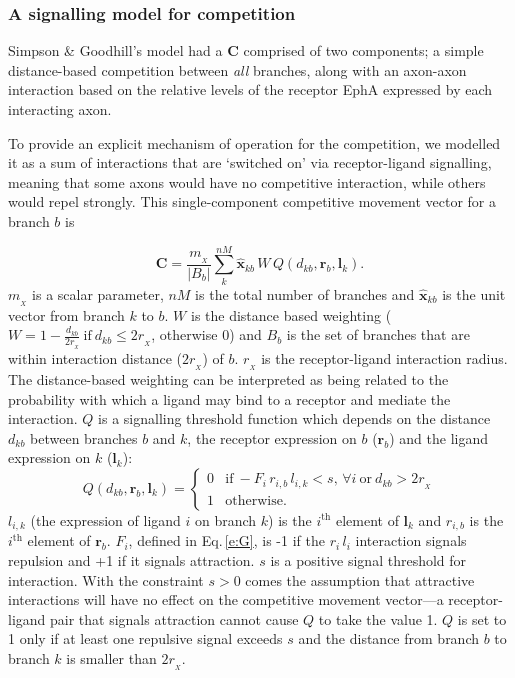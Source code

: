 \documentclass[9pt,lineno,draft]{elife}
\begin{document}
\subsubsection*{A signalling model for competition}

Simpson \& Goodhill's model had a $\mathbf{C}$ comprised of two components; a simple distance-based competition between \emph{all} branches, along with an axon-axon interaction based on the relative levels of the receptor EphA expressed by each interacting axon.


To provide an explicit mechanism of operation for the competition, we modelled it as a sum of interactions that are `switched on' via receptor-ligand signalling, meaning that some axons would have no competitive interaction, while others would repel strongly.
This single-component competitive movement vector for a branch $b$ is

\begin{equation} \label{e:X}
\mathbf{C} = \frac{m_{\!_X}}{|B_{b}|} \sum_k^{nM} \hat{\mathbf{x}}_{kb}\,W\,Q(d_{kb}, \mathbf{r}_{b}, \mathbf{l}_{k}).
\end{equation}
%
$m_{\!_X}$ is a scalar parameter, $nM$ is the total number of branches and $\hat{\mathbf{x}}_{kb}$ is the unit vector from branch $k$ to $b$.
%
$W$ is the distance based weighting ($W = 1-\frac{d_{kb}}{2r_{\!_X}}~\mathrm{if}~  d_{kb}\leq 2r_{\!_X}$, otherwise $0$) and $B_{b}$ is the set of branches that are within interaction distance ($2 r_{\!_X}$) of $b$. $r_{\!_X}$ is the receptor-ligand interaction radius.
%
The distance-based weighting can be interpreted as being related to the probability with which a ligand may bind to a receptor and mediate the interaction.
%
$Q$ is a signalling threshold function which depends on the distance $d_{kb}$ between branches $b$ and $k$, the receptor expression on $b$ ($\mathbf{r}_b$) and the ligand expression on $k$ ($\mathbf{l}_k$):
%
\begin{equation}
Q(d_{kb}, \mathbf{r}_{b}, \mathbf{l}_{k}) = \begin{cases}
                 0 & \mathrm{if}~-F_i\,r_{i,b}\,l_{i,k} <
                 s,\,\forall{i}~\mathrm{or}~d_{kb} > 2r_{\!_X} \\
                 1 & \mathrm{otherwise.}
     \end{cases}
\end{equation}
%
$l_{i,k}$ (the expression of ligand $i$ on branch $k$) is the $i^{\mathrm{th}}$ element of $\mathbf{l}_k$ and $r_{i,b}$ is the $i^{\mathrm{th}}$ element of $\mathbf{r}_b$.
$F_i$, defined in Eq.\,\ref{e:G}, is -1 if the $r_{i}\,l_{i}$ interaction signals repulsion and +1 if it signals attraction.
$s$ is a positive signal threshold for interaction.
With the constraint $s>0$ comes the assumption that attractive interactions will have no effect on the competitive movement vector---a receptor-ligand pair that signals attraction cannot cause $Q$ to take the value 1.
$Q$ is set to 1 only if at least one repulsive signal exceeds $s$ and the distance from branch $b$ to branch $k$ is smaller than $2 r_{\!_X}$.
\end{document}
